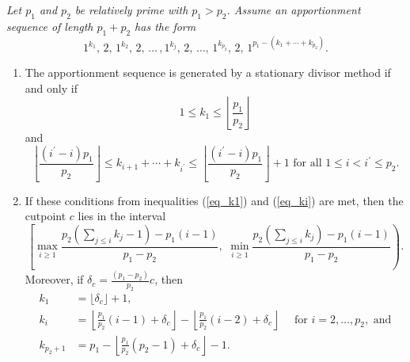 \documentclass[pdflatex,sn-mathphys-num]{sn-jnl}
\theoremstyle{thmstyleone}%
\theoremstyle{thmstyletwo}%
\theoremstyle{thmstylethree}%
\begin{document}
 {\it 
Let $p_1$ and $p_2$ be relatively prime with $p_1>p_2$.  Assume an apportionment sequence of length $p_1 + p_2$ has the form 
$$1^{k_1}, \, 2, \,  1^{k_2}, \, 2,  \, \ldots \, , 1^{k_j}, \, 2, \, \ldots , \, 1^{k_{p_2}},  \, 2, \, 1^{p_1-(k_1+\cdots +k_{p_2})}.$$ 
\begin{enumerate} 
\item The apportionment sequence is generated by a stationary divisor method if and only if
   \begin{equation*}\tag{1} 1 \le k_1 \le \left\lfloor \frac{p_1}{p_2} \right\rfloor \end{equation*} and
   \begin{equation*}\tag{2} \left\lfloor\frac{(i^\prime-i)p_1}{p_2}\right\rfloor \le k_{i+1}+ \cdots + k_{i^\prime} \le  \left\lfloor \frac{(i^\prime-i)p_1}{p_2}\right\rfloor + 1 \mbox{ for all } 1 \le i < i^\prime \le p_2. \end{equation*}

\item If these conditions from inequalities (\ref{eq_k1}) and (\ref{eq_ki}) are met, then the cutpoint $c$ lies in the interval 
\begin{equation*} \tag{3}
 \left[ \max_{i \ge 1} \frac{p_2(\sum_{j \le i} k_j-1) -p_1(i-1)}{p_1-p_2}, \,\, \min_{i \ge 1} \frac{p_2(\sum_{j \le i} k_j)-p_1(i-1)}{p_1-p_2}\right).\end{equation*}
Moreover, if  $\delta_c =  \frac{(p_1-p_2)}{p_2}c$, then 
\begin{equation*} \tag{4}
\begin{aligned}
 k_1 &=\lfloor  \delta_c \rfloor + 1, \\
 k_i & =\left\lfloor \frac{p_1}{p_2}(i-1) + \delta_c \right\rfloor - \left\lfloor \frac{p_1}{p_2}(i-2) + \delta_c \right\rfloor \quad \mbox{ for } i=2, \ldots, p_2, \text{ and}\\
k_{p_2+1} &= p_1 - \left\lfloor  \frac{p_1}{p_2}(p_2-1)+\delta_c \right\rfloor -1.\\
\end{aligned} 
\end{equation*}
\end{enumerate}}
\end{document}
